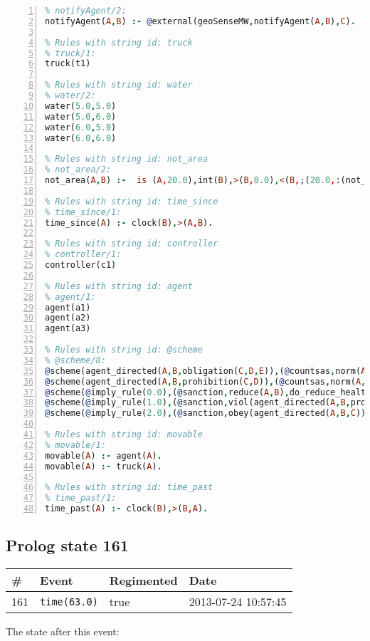 \documentclass[11pt]{article}\usepackage[utf8]{inputenc}\usepackage{geometry}
\begin{document}
\begin{lstlisting}[language=Prolog, numbers=left]
% Rules with string id: notifyAgent
% notifyAgent/2:
notifyAgent(A,B) :- @external(geoSenseMW,notifyAgent(A,B),C).

% Rules with string id: truck
% truck/1:
truck(t1)

% Rules with string id: water
% water/2:
water(5.0,5.0)
water(5.0,6.0)
water(6.0,5.0)
water(6.0,6.0)

% Rules with string id: not_area
% not_area/2:
not_area(A,B) :-  is (A,20.0),int(B),>(B,0.0),<(B,;(20.0,:(not_area(A,B), is (-(B),20.0)))),int(A),>(A,0.0),<(A,;(20.0,:(area(A,B),-(int(A))))),int(B),>(A,0.0),>(B,0.0),<(A,21.0),<(B,21.0).

% Rules with string id: time_since
% time_since/1:
time_since(A) :- clock(B),>(A,B).

% Rules with string id: controller
% controller/1:
controller(c1)

% Rules with string id: agent
% agent/1:
agent(a1)
agent(a2)
agent(a3)

% Rules with string id: @scheme
% @scheme/8:
@scheme(agent_directed(A,B,obligation(C,D,E)),(@countsas,norm(A,B,F,obligation(C,D,E)),F),false,(listTrue(C)),(time_past(D)),false,[plus(viol(agent_directed(A,B,obligation(C,D,E))))|[]],[plus(obey(agent_directed(A,B,obligation(C,D,E))))|[]])
@scheme(agent_directed(A,B,prohibition(C,D)),(@countsas,norm(A,B,E,prohibition(C,D)),E),(listTrue(C)),false,(false),false,[plus(viol(agent_directed(A,B,prohibition(C,D))))|[]],[plus(obey(agent_directed(A,B,prohibition(C,D))))|[]])
@scheme(@imply_rule(0.0),(@sanction,reduce(A,B),do_reduce_health(A,B),notifyAgent(A,changed(status))),true,false,false,false,[min(reduce(A,B))|[]],[])
@scheme(@imply_rule(1.0),(@sanction,viol(agent_directed(A,B,prohibition(C,D))),do_sanction(D)),true,false,false,false,[min(viol(agent_directed(A,B,prohibition(C,D))))|[]],[])
@scheme(@imply_rule(2.0),(@sanction,obey(agent_directed(A,B,C))),true,false,false,false,[min(obey(agent_directed(A,B,C)))|[]],[])

% Rules with string id: movable
% movable/1:
movable(A) :- agent(A).
movable(A) :- truck(A).

% Rules with string id: time_past
% time_past/1:
time_past(A) :- clock(B),>(B,A).

\end{lstlisting}
\clearpage 
\subsection{Prolog state 161}
\begin{table}[ht]
\centering 
\begin{tabular}{l l l l} 
\textbf{\#} & \textbf{Event} & \textbf{Regimented} & \textbf{Date} \\ [0.5ex] 
\hline
161&\texttt{time(63.0)}&true&2013-07-24 10:57:45\\ [1ex] \hline\end{tabular}
\end{table}
The state after this event:
\end{document}
